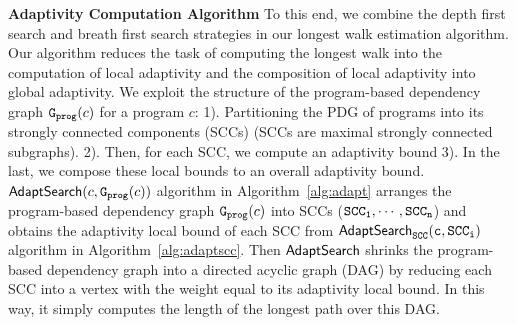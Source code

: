 \textbf{Adaptivity Computation Algorithm}
To this end, we combine the 
depth first search and breath first search strategies in our longest walk estimation algorithm.
%
Our algorithm reduces the task of computing the longest walk into the computation of local adaptivity and the composition of
local adaptivity into global adaptivity.
%
We exploit the structure of the program-based dependency graph $\mathtt{{G_{prog}}}(c)$ for a program $c$: 
1). Partitioning the PDG of programs into its strongly connected components (SCCs) (SCCs are maximal strongly connected subgraphs).
2). Then, for each SCC, we compute an adaptivity bound
3). In the last, we compose these local bounds to an overall adaptivity bound.
%
$\mathsf{AdaptSearch}(c, \mathtt{{G_{prog}}}(c))$ algorithm in Algorithm~\ref{alg:adapt} arranges the program-based dependency graph $\mathtt{{G_{prog}}}(c)$ into SCCs ($\mathtt{SCC_1}, \cdots, \mathtt{SCC_n}$) and obtains the adaptivity local bound of each SCC from $\mathtt{\mathsf{AdaptSearch}_{SCC}(c, SCC_i)}$ algorithm in Algorithm~\ref{alg:adaptscc}.
Then $\mathsf{AdaptSearch}$ shrinks the program-based dependency graph into a directed acyclic graph (DAG) by reducing each SCC into a vertex with the weight equal to its adaptivity local bound.
In this way, it simply computes the length of the longest path over this DAG.

